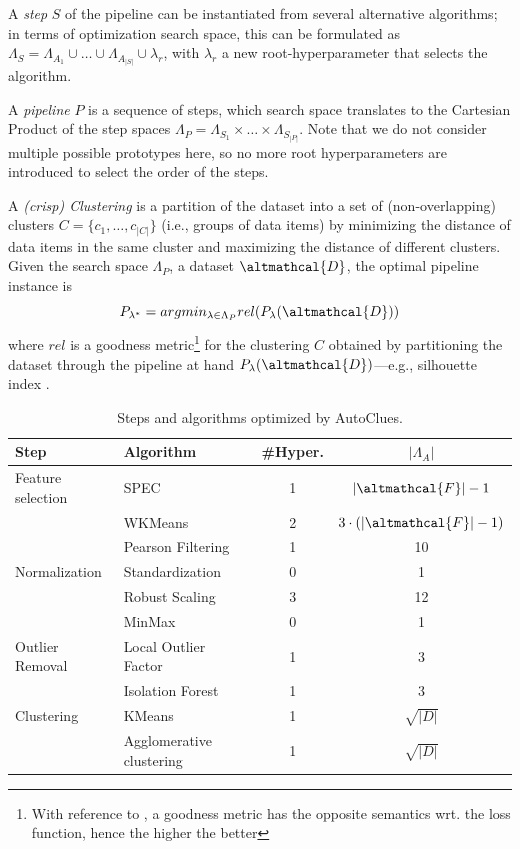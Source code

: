A \textit{step} $S$ of the pipeline can be instantiated from several alternative algorithms; in terms of optimization search space, this can be formulated as $\Lambda_S = \Lambda_{A_1} \cup \ldots \cup \Lambda_{A_{|S|}} \cup \lambda_r$, with $\lambda_r$ a new root-hyperparameter that selects the algorithm.

A \textit{pipeline} $P$ is a sequence of steps, which search space translates to the Cartesian Product of the step spaces $\Lambda_P = \Lambda_{S_1} \times \ldots \times \Lambda_{S_{|P|}}$.
Note that we do not consider multiple possible prototypes here, so no more root hyperparameters are introduced to select the order of the steps.

A \textit{(crisp) Clustering} is a partition of the dataset into a set of (non-overlapping) clusters  $C=\{c_1, \ldots, c_{|C|}\}$ (i.e., groups of data items) by minimizing the distance of data items in the same cluster and maximizing the distance of different clusters.
Given the search space $\Lambda_P$, a dataset $\altmathcal{D}$, the optimal pipeline instance is
\begin{equation}
\label{eq:optimization}
    P_{\lambda^*} = argmin_{\lambda \in \Lambda_P} rel(P_{\lambda}(\altmathcal{D}))
\end{equation}
where $rel$ is a goodness metric\footnote{With reference to , a goodness metric has the opposite semantics wrt. the loss function, hence the higher the better} for the clustering $C$ obtained by partitioning the dataset through the pipeline at hand $P_{\lambda}(\altmathcal{D})$---e.g., silhouette index \cite{zhu2010clustering}.


\begin{table}[!ht]
    \centering
    \begin{tabular}{lp{8cm}cc}
        \hline
        Step     & Algorithm & \#Hyper. & $|\Lambda_A|$\\\hline
        Feature selection & SPEC \cite{zhao2007spectral} & 1 & $|\altmathcal{F}|-1$\\
         & WKMeans \cite{WKMeans} & 2 & $3 \cdot (|\altmathcal{F}|-1)$\\
         & Pearson Filtering & 1 & 10\\
        Normalization     & Standardization & 0 & 1\\
        & Robust Scaling & 3 & 12\\
        & MinMax & 0 & 1\\
        Outlier Removal   & Local Outlier Factor \cite{breunig2000lof} & 1 & 3\\
        & Isolation Forest \cite{liu2012isolation} & 1 & 3\\
        Clustering  & KMeans \cite{arthur2006k} & 1 & $\sqrt{|D|}$\\
        & Agglomerative clustering  \cite{murtagh2017algorithms} & 1 & $\sqrt{|D|}$\\\hline
    \end{tabular}
    \caption{Steps and algorithms optimized by AutoClues.}
    \label{clustering-tbl:processing}
\end{table}


